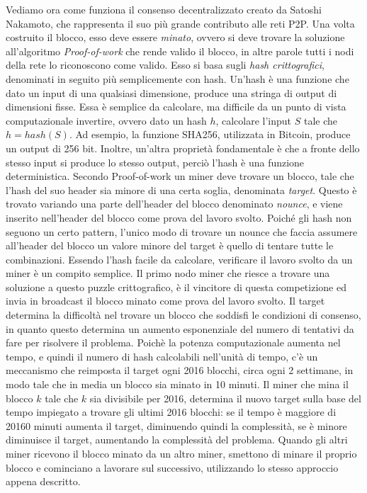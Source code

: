 Vediamo ora come funziona il consenso decentralizzato creato da Satoshi Nakamoto, che rappresenta il suo più grande contributo alle reti P2P. Una volta costruito il blocco, esso deve essere \emph{minato}, ovvero si deve trovare la soluzione all'algoritmo \emph{Proof-of-work} che rende valido il blocco, in altre parole tutti i nodi della rete lo riconoscono come valido. Esso si basa sugli \emph{hash crittografici}, denominati in seguito più semplicemente con hash. Un'hash è una funzione che dato un input di una qualsiasi dimensione, produce una stringa di output di dimensioni fisse. Essa è semplice da calcolare, ma difficile da un punto di vista computazionale invertire, ovvero dato un hash $h$, calcolare l'input $S$ tale che $h = hash(S)$. Ad esempio, la funzione SHA256, utilizzata in Bitcoin, produce un output di 256 bit. Inoltre, un'altra proprietà fondamentale è che a fronte dello stesso input si produce lo stesso output, perciò l'hash è una funzione deterministica. Secondo Proof-of-work un miner deve trovare un blocco, tale che l'hash del suo header sia minore di una certa soglia, denominata \emph{target}. Questo è trovato variando una parte dell'header del blocco denominato \emph{nounce}, e viene inserito nell'header del blocco come prova del lavoro svolto. Poiché gli hash non seguono un certo pattern, l'unico modo di trovare un nounce che faccia assumere all'header del blocco un valore minore del target è quello di tentare tutte le combinazioni. Essendo l'hash facile da calcolare, verificare il lavoro svolto da un miner è un compito semplice. Il primo nodo miner che riesce a trovare una soluzione a questo puzzle crittografico, è il vincitore di questa competizione ed invia in broadcast il blocco minato come prova del lavoro svolto.
Il target determina la difficoltà nel trovare un blocco che soddisfi le condizioni di consenso, in quanto questo determina un aumento esponenziale del numero di tentativi da fare per risolvere il problema. Poichè la potenza computazionale aumenta nel tempo, e quindi il numero di hash calcolabili nell'unità di tempo, c'è un meccanismo che reimposta il target ogni 2016 blocchi, circa ogni 2 settimane, in modo tale che in media un blocco sia minato in 10 minuti. Il miner che mina il blocco $k$ tale che $k$ sia divisibile per 2016, determina il nuovo target sulla base del tempo impiegato a trovare gli ultimi 2016 blocchi: se il tempo è maggiore di 20160 minuti aumenta il target, diminuendo quindi la complessità, se è minore diminuisce il target, aumentando la complessità del problema.
Quando gli altri miner ricevono il blocco minato da un altro miner, smettono di minare il proprio blocco e cominciano a lavorare sul successivo, utilizzando lo stesso approccio appena descritto.


